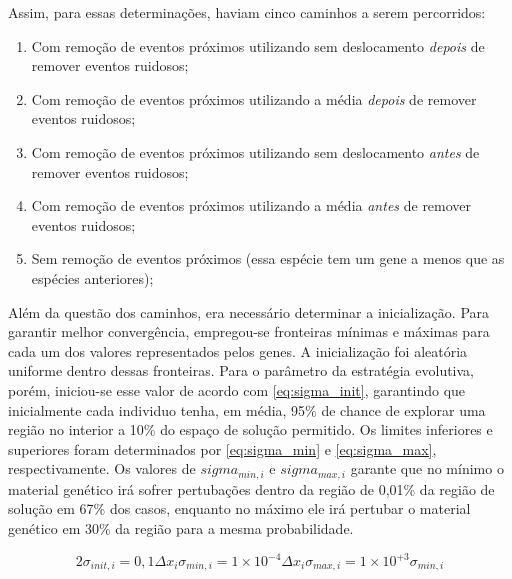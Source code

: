 Assim, para essas determinações, haviam cinco caminhos a serem
percorridos: 

\begin{enumerate}[label=(\Roman*)]
\item Com remoção de eventos próximos utilizando sem deslocamento
\emph{depois} de remover eventos ruidosos;
\item Com remoção de eventos próximos utilizando a média 
\emph{depois} de remover eventos ruidosos;
\item Com remoção de eventos próximos utilizando sem deslocamento
\emph{antes} de remover eventos ruidosos;
\item Com remoção de eventos próximos utilizando a média 
\emph{antes} de remover eventos ruidosos;
\item Sem remoção de eventos próximos (essa espécie tem um gene a
menos que as espécies anteriores); 
\end{enumerate}

Além da questão dos caminhos, era necessário determinar a
inicialização. Para garantir melhor convergência, empregou-se
fronteiras mínimas e máximas para cada um dos valores representados
pelos genes. A inicialização foi aleatória uniforme dentro dessas
fronteiras. Para o parâmetro da estratégia evolutiva, porém,
iniciou-se esse valor de acordo com \ref{eq:sigma_init}, garantindo
que inicialmente cada individuo tenha, em média, 95\% de chance de
explorar uma região no interior a 10\% do espaço de solução permitido. Os
limites inferiores e superiores foram determinados por
\ref{eq:sigma_min} e \ref{eq:sigma_max}, respectivamente. Os valores
de $sigma_{min,i}$ e $sigma_{max,i}$ garante que no mínimo o material
genético irá sofrer pertubações dentro da região de 0,01\% da região
de solução em 67\% dos casos, enquanto no máximo ele irá pertubar o
material genético em 30\% da região para a mesma probabilidade.

\begin{subequations}
\begin{equation}\label{eq:sigma_init}
2\sigma_{init,i}=0,1\Delta x_i
\end{equation}
\begin{equation}\label{eq:sigma_min}
\sigma_{min,i}=1\times10^{-4}\Delta x_i
\end{equation}
\begin{equation}\label{eq:sigma_max}
\sigma_{max,i}=1\times10^{+3}\sigma_{min,i}
\end{equation}
\end{subequations}

